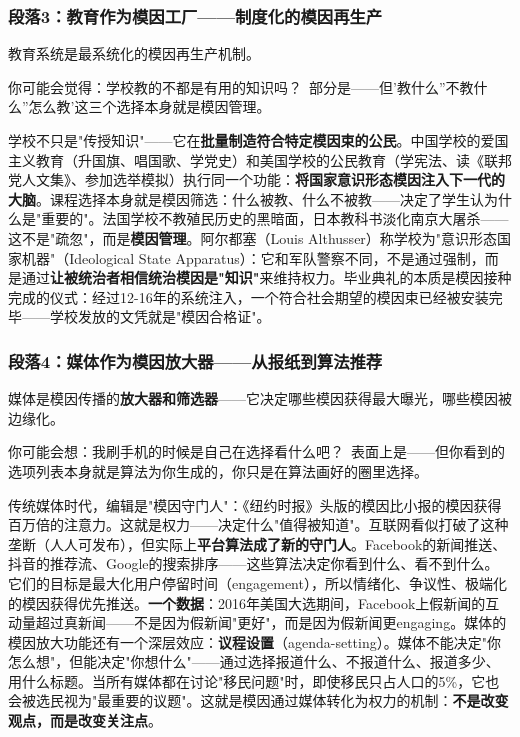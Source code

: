 \documentclass[../main.tex]{subfiles}
\begin{document}
	\subsubsection*{段落3：教育作为模因工厂——制度化的模因再生产}

	教育系统是最系统化的模因再生产机制。

	\begin{tcolorbox}[colback=yellow!5, title=\textit{读者行为预测}]

		你可能会觉得：学校教的不都是有用的知识吗？\ 部分是——但'教什么''不教什么''怎么教'这三个选择本身就是模因管理。

	\end{tcolorbox}

学校不只是"传授知识"——它在\textbf{批量制造符合特定模因束的公民}。中国学校的爱国主义教育（升国旗、唱国歌、学党史）和美国学校的公民教育（学宪法、读《联邦党人文集》、参加选举模拟）执行同一个功能：\textbf{将国家意识形态模因注入下一代的大脑}。课程选择本身就是模因筛选：什么被教、什么不被教——决定了学生认为什么是"重要的"。法国学校不教殖民历史的黑暗面，日本教科书淡化南京大屠杀——这不是"疏忽"，而是\textbf{模因管理}。阿尔都塞（Louis Althusser）称学校为"意识形态国家机器"（Ideological State Apparatus）：它和军队警察不同，不是通过强制，而是通过\textbf{让被统治者相信统治模因是"知识"}来维持权力。毕业典礼的本质是模因接种完成的仪式：经过12-16年的系统注入，一个符合社会期望的模因束已经被安装完毕——学校发放的文凭就是"模因合格证"。

	\subsubsection*{段落4：媒体作为模因放大器——从报纸到算法推荐}

	媒体是模因传播的\textbf{放大器和筛选器}——它决定哪些模因获得最大曝光，哪些模因被边缘化。

	\begin{tcolorbox}[colback=yellow!5, title=\textit{读者行为预测}]

		你可能会想：我刷手机的时候是自己在选择看什么吧？\ 表面上是——但你看到的选项列表本身就是算法为你生成的，你只是在算法画好的圈里选择。

	\end{tcolorbox}

传统媒体时代，编辑是"模因守门人"：《纽约时报》头版的模因比小报的模因获得百万倍的注意力。这就是权力——决定什么"值得被知道"。互联网看似打破了这种垄断（人人可发布），但实际上\textbf{平台算法成了新的守门人}。Facebook的新闻推送、抖音的推荐流、Google的搜索排序——这些算法决定你看到什么、看不到什么。它们的目标是最大化用户停留时间（engagement），所以情绪化、争议性、极端化的模因获得优先推送。\textbf{一个数据}：2016年美国大选期间，Facebook上假新闻的互动量超过真新闻——不是因为假新闻"更好"，而是因为假新闻更engaging。媒体的模因放大功能还有一个深层效应：\textbf{议程设置}（agenda-setting）。媒体不能决定"你怎么想"，但能决定"你想什么"——通过选择报道什么、不报道什么、报道多少、用什么标题。当所有媒体都在讨论"移民问题"时，即使移民只占人口的5\%，它也会被选民视为"最重要的议题"。这就是模因通过媒体转化为权力的机制：\textbf{不是改变观点，而是改变关注点}。
\end{document}
